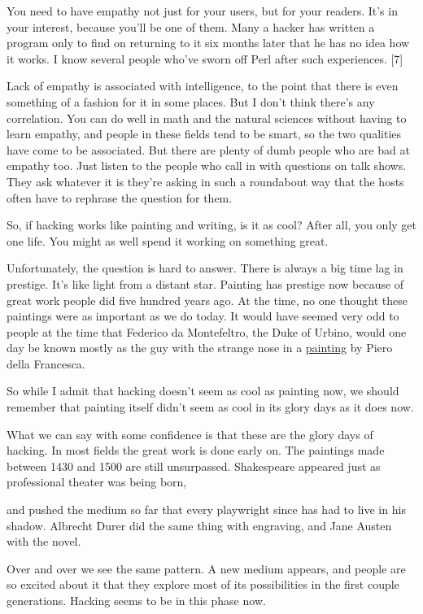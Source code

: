 You need to have 
empathy not just for your users, but for your readers.  It's in  
your interest, because you'll be one of them.
Many a hacker has written a program only to
find on returning to it six months later that he has no idea   
how it works.  I know several people who've sworn off Perl after
such experiences. [7]

Lack of empathy is associated with intelligence, to the point
that there is even something of a fashion for it in some places.
But I don't think there's any correlation.
You can do well in math and
the natural sciences without having to learn empathy, and people in these
fields tend to be smart, so the two qualities have come to be
associated.  But there are plenty of dumb people who are bad at
empathy too.  Just listen to the people who call in with questions on
talk shows.  They ask whatever it is they're asking in
such a roundabout way
that the hosts often have to rephrase the question for them.



So, if hacking works like painting and writing, is it as cool?
After all, you only get one life.
You might as well spend it working on something great.

Unfortunately, the question is hard to answer.  There is always
a big time lag in prestige.  It's like light from a distant star.
Painting has prestige now because of great work people did five hundred
years ago.  At the time, no one thought
these paintings were as important as we do today.  It would have
seemed very odd to people at the time that Federico da Montefeltro,
the Duke of Urbino, would one day be known mostly as the guy
with the strange nose in a \href{http://www.paulgraham.com/montefeltro.html}{painting} 
by Piero della Francesca.

So while I admit that hacking doesn't seem as cool as painting now,
we should remember that painting itself didn't seem as cool in
its glory days as it does now.

What we can say with some confidence is that these are the glory
days of hacking.  In most fields the great work is done early on.
The paintings made between 1430 and 1500 are still unsurpassed.
Shakespeare appeared just as professional theater was being born,

and pushed the medium
so far that every playwright since has had to live in his shadow.
Albrecht Durer did the same thing with engraving, and Jane Austen
with the novel.

Over and over we see the same pattern.  A new medium appears, and
people are so excited about it that they explore most of its
possibilities in the first couple generations.   Hacking seems
to be in this phase now.

